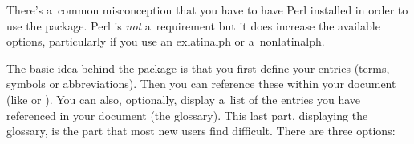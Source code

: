 \documentclass[report,inlinetitle,widecs]{nlctdoc}
\begin{document}
\begin{important}
There's a~common misconception that you have to have Perl installed
in order to use the  package. Perl is \emph{not}
a~requirement but it does increase the available options,
particularly if you use an \gls{exlatinalph} or a~\gls{nonlatinalph}.
\end{important}

The basic idea behind the  package is that you
first define your entries (terms, symbols or abbreviations). Then
you can reference these within your document (like  or
).  You can also, optionally, display a~list of the entries
you have referenced in your document (the glossary). This last part,
displaying the glossary, is the part that most new users find
difficult. There are three options:
\end{document}
